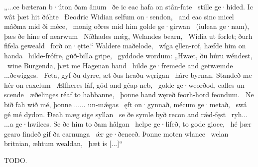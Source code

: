 \bvg\bva „...ce bæteran
b·úton ðam ânum \hld\ ðe ic eac hafa
on stân-fate \hld\ stille ge·hided.
Ic wât þæt hit ðóhte \hld\ Ðeodric Widian
selfum on·sendon, \hld\ and eac sinc micel
mâðma mid ði méce, \hld\ monig oðres mid him
golde ge·girwan \hld\ (iulean ge·nam),
þæs ðe hine of nearwum \hld\ Níðhades mǽg,
Welandes bearn, \hld\ Widia ut forlet;
ðurh fifela geweald \hld\ forð on·ętte.“
Waldere maðelode, \hld\ wíga ęllen-rof,
hæfde him on handa \hld\ hilde-frófre,
gu̇ð-billa gripe, \hld\ gyddode wordum:
„Hwæt, ðu húru wéndest, \hld\ wine Burgenda,
þæt me Hagenan hand \hld\ hilde ge·fremede
and getwæmde ...ðewigges. \hld\ Feta, gyf ðu dyrre,
æt ðus heaðu-węrigan \hld\ hâre byrnan.
Standeð me hér on eaxelum \hld\ Ælfheres lâf,
gód and géap-neb, \hld\ golde ge·weorðod,
ealles un-scende \hld\ æðelinges réaf
to habbanne, \hld\ þonne hand węreð
feorh-hord feondum. \hld\ Ne bið fah wið mé,
þonne ...... un-mǽgas \hld\ ęft on·gynnað,
mécum ge·metað, \hld\ swá gé mé dydon.
Ðeah mæg sige syllan \hld\ se ðe symle byð
recon and rǽd-fęst \hld\ ryh... ...a ge·hwilces.
Se ðe him to ðam hâlgan \hld\ helpe ge·lifeð,
to gode gioce, \hld\ hé þær gearo findeð
gif ða earnunga \hld\ ǽr ge·ðenceð.
Þonne moten wlance \hld\ welan britnian,
æhtum wealdan, \hld\ þæt is [...]“\eva

\bvb TODO.\evb\evg

\sectionline
